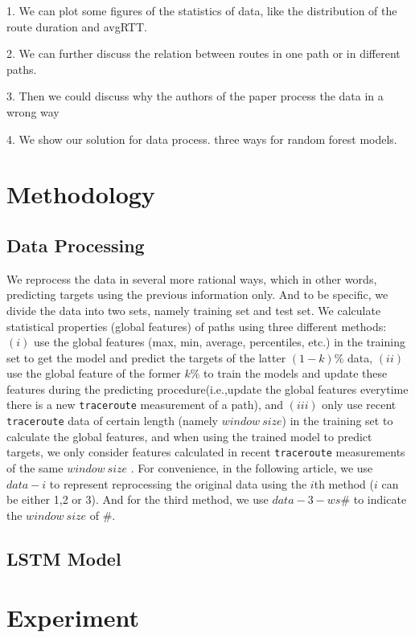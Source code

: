 \documentclass[sigconf]{acmart}
\begin{document}
1. We can plot some figures of the statistics of data, like the distribution of the route duration and avgRTT. 

2. We can further discuss the relation between routes in one path or in different paths.

3. Then we could discuss why the authors of the paper process the data in a wrong way

4. We show our solution for data process. three ways for random forest models.


\section{Methodology}
\subsection{Data Processing}
We reprocess the data in several more rational ways, which in other words, predicting targets using the previous information only. And to be specific, we divide the data into two sets, namely training set and test set. We calculate statistical properties (global features) of paths using three different methods: $(i)$ use the global features (max, min, average, percentiles, etc.) in the training set to get the model and predict the targets of the latter $(1-k)\%$ data, $(ii)$ use the global feature of the former $k\%$ to train the models and update these features during the predicting procedure(i.e.,update the global features everytime there is a new \texttt{traceroute} measurement of a path), and $(iii)$ only use recent \texttt{traceroute} data of certain length (namely $window\ size$) in the training set to calculate the global features, and when using the trained model to predict targets, we only consider features calculated in  recent \texttt{traceroute} measurements of the same $window\ size$ . For convenience, in the following article, we use $data-i$ to represent reprocessing the original data using the $i$th method ($i$ can be either 1,2 or 3). And for the third method, we use $data-3-ws\#$ to indicate the $window\ size$ of $\#$.

\subsection{LSTM Model}

\section{Experiment}
\end{document}
